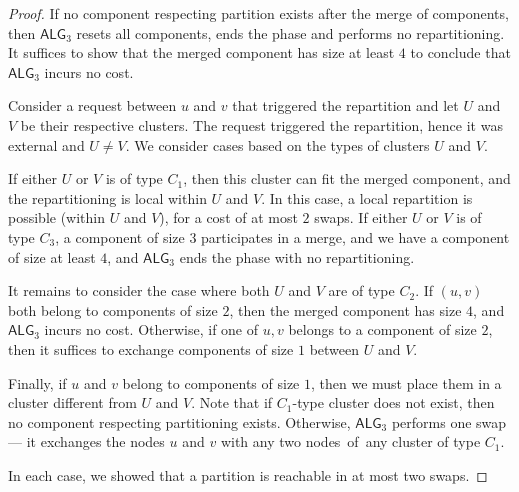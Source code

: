 \documentclass[a4paper,anonymous,USenglish]{lipics-v2019}
\newcommand{\TAlg}{{\ensuremath{\textsf{ALG}_{3}}}\xspace}
\begin{document}
\begin{proof}
	If no component respecting partition exists after the merge of components, then \TAlg resets all components, ends the phase and performs no repartitioning.
	It suffices to show that the merged component has size at least $4$ to conclude that \TAlg incurs no cost.
	
	
	Consider a request between $u$ and $v$ that triggered the repartition and let $U$ and $V$ be their respective clusters.
	The request triggered the repartition, hence it was external and $U\neq V$.
	We consider cases based on the types of clusters $U$ and $V$.
	
	If either $U$ or $V$ is of type $C_1$, then this cluster can fit the merged component, and the repartitioning is local within $U$ and $V$.
	In this case, a local repartition is possible (within $U$ and $V$), for a cost of at most $2$ swaps.
	If either $U$ or $V$ is of type $C_3$, a component of size $3$ participates in a merge, and we have a component of size at least $4$, and \TAlg ends the phase with no repartitioning.
	
	
	It remains to consider the case where both $U$ and $V$ are of type $C_2$.
	If $(u,v)$ both belong to components of size $2$, then the merged component has size $4$, and \TAlg incurs no cost. 
	Otherwise, if one of $u,v$ belongs to a component of size $2$, then it suffices to exchange components of size $1$ between $U$ and $V$.

	Finally, if $u$ and $v$ belong to components of size $1$, then we must place them in a cluster different from $U$ and $V$.
	Note that if $C_1$-type cluster does not exist, then no component respecting partitioning exists.
	Otherwise, \TAlg performs one swap --- it exchanges the nodes $u$ and $v$ with any two nodes~of~any cluster of type $C_1$.

	In each case, we showed that a partition is reachable in at most two swaps.
\end{proof}
\end{document}
